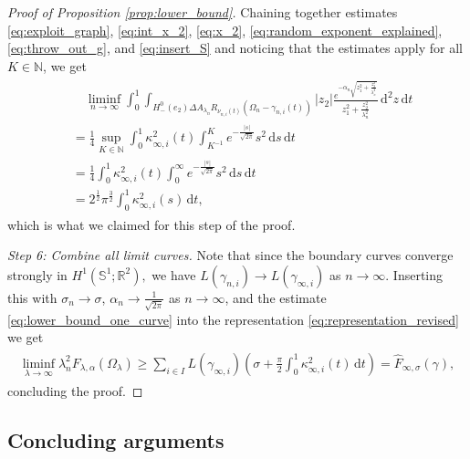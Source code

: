 \documentclass[11pt]{article}
\numberwithin{statement}{section}
\numberwithin{equation}{section}
\theoremstyle{remark}
\newcommand{\R}{\mathbb R} 				%
\newcommand{\N}{\mathbb N}
\newcommand{\intd}{\, \mathrm{d}} 				%
\newcommand{\Sph}{{\mathbb S}}				%
\begin{document}
\begin{proof}[Proof of Proposition \ref{prop:lower_bound}]
	Chaining together estimates \eqref{eq:exploit_graph},
        \eqref{eq:int_x_2}, \eqref{eq:x_2},
        \eqref{eq:random_exponent_explained}, \eqref{eq:throw_out_g},
        and \eqref{eq:insert_S} and noticing that the estimates
          apply for all $K \in \N$, we get 
	\begin{align}
	  \begin{split}
            & \quad \liminf_{n \to \infty} \int_0^1 \int_{ H^0_-(e_2)
              \Delta A_{\lambda_n} R_{\nu_{n,i}(t)} (\Omega_n -
              \gamma_{n,i}(t)) } \left| z_2 \right|
            \frac{e^{-\alpha_n\sqrt{z_1^2 + \frac{z_2^2}{\lambda_n^2}
                }}}{z_1^2 +
              \frac{z_2^2}{\lambda_n^2}} \intd^2 z \intd t\\
            & = \frac{1}{4} \sup_{K \in \N} \int_0^1 \kappa_{\infty,i}^2(t)
            \int_{K^{-1}}^K e^{- \frac{|s|}{\sqrt{2\pi}}} s^2 \intd s
            \intd t\\
            & = \frac{1}{4} \int_0^1 \kappa_{\infty,i}^2(t) \int_{0}^\infty e^{-
              \frac{|s|}{\sqrt{2\pi}}} s^2 \intd s
            \intd t\\
            & = 2^{\frac{1}{2}} \pi^\frac{3}{2} \int_0^1
            \kappa^2_{\infty,i}(s) \intd t,
	  \end{split}
	\end{align}
	which is what we claimed for this step of the proof.

        \textit{Step 6: Combine all limit curves.}  Note that since
        the boundary curves converge strongly in
        $H^1(\Sph^1; \R^2),$ we have
        $L(\gamma_{n,i}) \to L(\gamma_{\infty,i})$ as $n \to \infty$.
        Inserting this with $\sigma_n \to \sigma$,
        $\alpha_n \to \frac{1}{\sqrt{2\pi}}$ as $n\to \infty$, and the
        estimate \eqref{eq:lower_bound_one_curve} into the
        representation \eqref{eq:representation_revised} we get
	\begin{align}
	  \begin{split}
            \liminf_{\lambda \to \infty} \lambda_n^2
            F_{\lambda,\alpha}(\Omega_\lambda)\geq \sum_{i\in I}
            L(\gamma_{\infty,i}) \left( \sigma + \frac{ \pi}{2}
              \int_0^1 \kappa^2_{\infty,i}(t) \intd t \right) = \hat
            F_{\infty,\sigma} (\gamma),
	  \end{split}
	\end{align}
	concluding the proof.
\end{proof}

\subsection{Concluding arguments}
\end{document}
